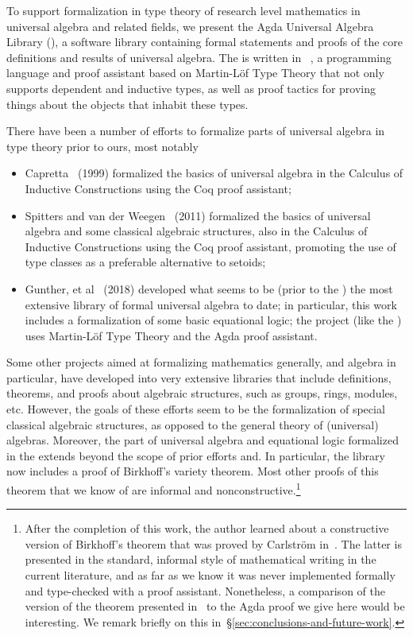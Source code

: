 To support formalization in type theory of research level mathematics in universal algebra and related fields, we present the Agda Universal Algebra Library (\agdaualib), a software library containing formal statements and proofs of the core definitions and results of universal algebra. 
The \ualib is written in \agda~\cite{Norell:2009}, a programming language and proof assistant based on Martin-L\"of Type Theory that not only supports dependent and inductive types, as well as proof tactics for proving things about the objects that inhabit these types.

There have been a number of efforts to formalize parts of universal algebra in type theory prior to ours, most notably
\begin{itemize}
  \item Capretta~\cite{Capretta:1999} (1999) formalized the basics of universal algebra in the Calculus of Inductive Constructions using the Coq proof assistant;
    \item Spitters and van der Weegen~\cite{Spitters:2011} (2011) formalized the basics of universal algebra and some classical algebraic structures, also in the Calculus of Inductive Constructions using the Coq proof assistant, promoting the use of type classes as a preferable alternative to setoids;
 \item Gunther, et al~\cite{Gunther:2018} (2018) developed what seems to be (prior to the \ualib) the most extensive library of formal universal algebra to date; in particular, this work includes a formalization of some basic equational logic; the project (like the \ualib) uses Martin-L\"of Type Theory and the Agda proof assistant.
\end{itemize}
Some other projects aimed at formalizing mathematics generally, and algebra in particular, have developed into very extensive libraries that include definitions, theorems, and proofs about algebraic structures, such as groups, rings, modules, etc.  However, the goals of these efforts seem to be the formalization of special classical algebraic structures, as opposed to the general theory of (universal) algebras. Moreover, the part of universal algebra and equational logic formalized in the \ualib extends beyond the scope of prior efforts and. In particular, the library now includes a proof of Birkhoff's variety theorem.  Most other proofs of this theorem that we know of are informal and nonconstructive.\footnote{After the completion of this work, the author learned about a constructive version of Birkhoff's theorem that was proved by Carlstr\"om in~\cite{Carlstrom:2008}.  The latter is presented in the standard, informal style of mathematical writing in the current literature, and as far as we know it was never implemented formally and type-checked with a proof assistant. Nonetheless, a comparison of the version of the theorem presented in~\cite{Carlstrom:2008} to the Agda proof we give here would be interesting. We remark briefly on this in~\S\ref{sec:conclusions-and-future-work}.}

